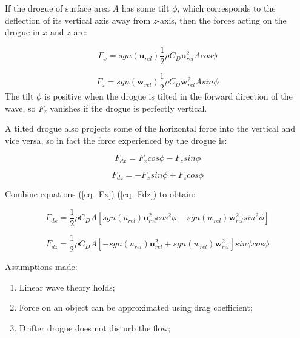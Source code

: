\documentclass[12pt,letterpaper]{article}
\begin{document}
If the drogue of surface area $A$ has some tilt $\phi$, which corresponds
to the deflection of its vertical axis away from $z$-axis, then the 
forces acting on the drogue in $x$ and $z$ are:

\begin{equation}
F_x = sgn(\mathbf{u}_{rel}) \dfrac{1}{2} \rho C_D \mathbf{u}_{rel}^2 A cos{\phi}
\label{eq_Fx}
\end{equation}

\begin{equation}
F_z = sgn(\mathbf{w}_{rel}) \dfrac{1}{2} \rho C_D \mathbf{w}_{rel}^2 A sin{\phi}
\label{eq_Fz}
\end{equation}
The tilt $\phi$ is positive when the drogue is tilted in the forward direction
of the wave, so $F_z$ vanishes if the drogue is perfectly vertical. 

A tilted drogue also projects some of the horizontal force into the vertical
and vice versa, so in fact the force experienced by the drogue is:

\begin{equation}
F_{dx} = F_x cos{\phi} -  F_z sin{\phi}
\label{eq_Fdx}
\end{equation}

\begin{equation}
F_{dz} = -F_x sin{\phi} + F_z cos{\phi}
\label{eq_Fdz}
\end{equation}

Combine equations (\ref{eq_Fx})-(\ref{eq_Fdz}) to obtain:

\begin{equation}
F_{dx} = \dfrac{1}{2} \rho C_D A 
\left[
 sgn(u_{rel}) \mathbf{u}_{rel}^2 cos^2{\phi} 
-sgn(w_{rel}) \mathbf{w}_{rel}^2 sin^2{\phi}
\right]
\end{equation}

\begin{equation}
F_{dz} = \dfrac{1}{2} \rho C_D A 
\left[
-sgn(u_{rel}) \mathbf{u}_{rel}^2 
+sgn(w_{rel}) \mathbf{w}_{rel}^2
\right]
sin{\phi} cos{\phi}
\end{equation}

Assumptions made:

\begin{enumerate}

\item Linear wave theory holds;

\item Force on an object can be approximated using drag coefficient;

\item Drifter drogue does not disturb the flow;

\end{enumerate}
\end{document}
